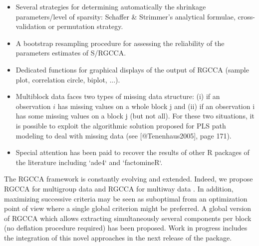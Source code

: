 \documentclass[
]{jss}
\begin{document}
\begin{itemize}
\item Several strategies for determining automatically the shrinkage 
parameters/level of sparsity: Schaffer \& Strimmer's analytical formulae,  
cross-validation or permutation strategy.

\item A bootstrap resampling procedure for assessing the reliability of the 
parameters estimates of S/RGCCA.

\item Dedicated functions for graphical displays of the output of RGCCA 
(sample plot, correlation circle, biplot, ...).

\item Multiblock data faces two types of missing data structure: (i) if an 
observation $i$ has missing values on a whole block j and (ii) if an 
observation i has some missing values on a block j (but not all). For these two 
situations, it is possible to exploit the algorithmic solution proposed for PLS 
path modeling to deal with missing data (see [@Tenenhaus2005], page 171).

\item Special attention has been paid to recover the results of other R packages 
of the literature including `ade4` and `factomineR`.
\end{itemize}

The RGCCA framework is constantly evolving and extended. Indeed, we
propose RGCCA for multigroup data \citep{Tenenhaus2014b} and RGCCA for
multiway data \citep[\citet{Girka2023}]{Gloaguen2020}. In addition,
maximizing successive criteria may be seen as suboptimal from an
optimization point of view where a single global criterion might be
preferred. A global version of RGCCA \citep{Gloaguen2020b} which allows
extracting simultaneously several components per block (no deflation
procedure required) has been proposed. Work in progress includes the
integration of this novel approaches in the next release of the package.

\renewcommand\refname{References}

\end{document}
